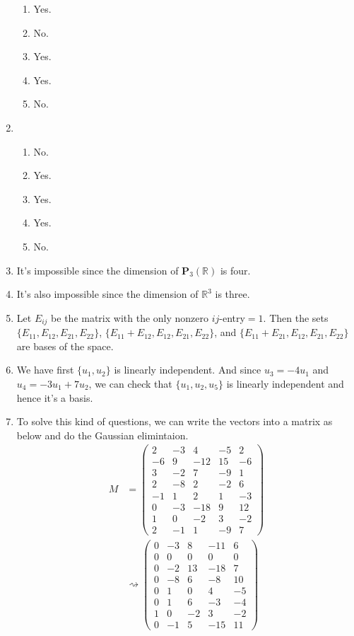 \begin{enumerate}
\begin{enumerate}
\item Yes.
\item No.
\item Yes.
\item Yes.
\item No.
\end{enumerate}
\item \begin{enumerate}
\item No.
\item Yes.
\item Yes.
\item Yes.
\item No.
\end{enumerate}
\item It's impossible since the dimension of $\mathbf{P}_3(\mathbb{R})$ is four.
\item It's also impossible since the dimension of $\mathbb{R}^3$ is three.
\item Let $E_{ij}$ be the matrix with the only nonzero $ij$-entry$=1$. Then the sets $\{E_{11},E_{12},E_{21},E_{22}\}$, $\{E_{11}+E_{12},E_{12},E_{21},E_{22}\}$, and $\{E_{11}+E_{21},E_{12},E_{21},E_{22}\}$ are bases of the space.
\item We have first $\{u_1,u_2\}$ is linearly independent. And since $u_3=-4u_1$ and $u_4=-3u_1+7u_2$, we can check that $\{u_1,u_2,u_5\}$ is linearly independent and hence it's a basis.
\item To solve this kind of questions, we can write the vectors into a matrix as below and do the Gaussian elimintaion.
\begin{align*}
M&=\left( \begin{array}{ccccc}2&-3&4&-5&2\\-6&9&-12&15&-6\\3&-2&7&-9&1\\2&-8&2&-2&6\\-1&1&2&1&-3\\0&-3&-18&9&12\\1&0&-2&3&-2\\2&-1&1&-9&7\end{array}\right)\\
&\rightsquigarrow \left( \begin{array}{ccccc}0&-3&8&-11&6\\0&0&0&0&0\\0&-2&13&-18&7\\0&-8&6&-8&10\\0&1&0&4&-5\\0&1&6&-3&-4\\1&0&-2&3&-2\\0&-1&5&-15&11\end{array}\right)\\

\end{align*}
\end{enumerate}
